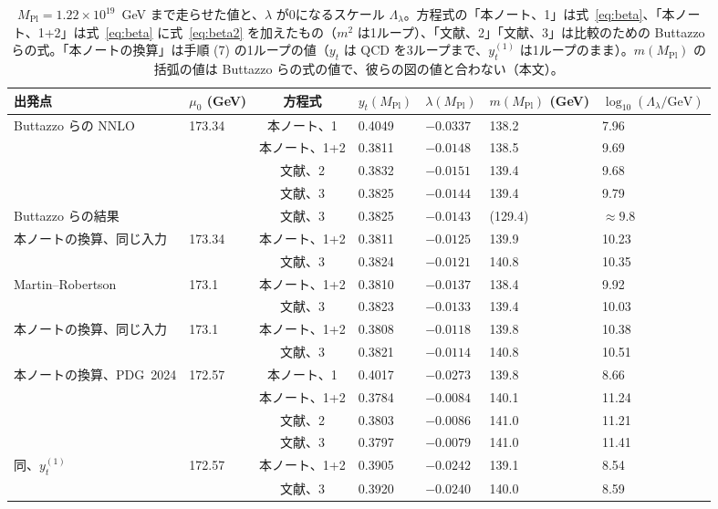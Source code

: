 \documentclass[a4paper,10pt]{ltjsarticle}
\begin{document}
\begin{table}[tbp]
\centering\footnotesize\setlength{\tabcolsep}{4.5pt}
\caption{$M_{\mathrm{Pl}}=1.22\times10^{19}$~GeV まで走らせた値と、$\lambda$ が0になるスケール $\Lambda_\lambda$。方程式の「本ノート、1」は式~\eqref{eq:beta}、「本ノート、1+2」は式~\eqref{eq:beta} に式~\eqref{eq:beta2} を加えたもの（$m^2$ は1ループ）、「文献、2」「文献、3」は比較のための Buttazzo らの式。「本ノートの換算」は手順 (7) の1ループの値（$y_t$ は QCD を3ループまで、$y_t^{(1)}$ は1ループのまま）。$m(M_{\mathrm{Pl}})$ の括弧の値は Buttazzo らの式の値で、彼らの図の値と合わない（本文）。}
\label{tab:rgrun}
\begin{tabular}{llcllll}
\toprule
出発点 & $\mu_0$ (GeV) & 方程式 & $y_t(M_{\mathrm{Pl}})$ & $\lambda(M_{\mathrm{Pl}})$ & $m(M_{\mathrm{Pl}})$ (GeV) & $\log_{10}(\Lambda_\lambda/\mathrm{GeV})$ \\
\midrule
Buttazzo らの NNLO & 173.34 & 本ノート、1 & 0.4049 & $-0.0337$ & 138.2 & 7.96 \\
 & & 本ノート、1+2 & 0.3811 & $-0.0148$ & 138.5 & 9.69 \\
 & & 文献、2 & 0.3832 & $-0.0151$ & 139.4 & 9.68 \\
 & & 文献、3 & 0.3825 & $-0.0144$ & 139.4 & 9.79 \\
Buttazzo らの結果 & & 文献、3 & 0.3825 & $-0.0143$ & (129.4) & $\approx9.8$ \\
本ノートの換算、同じ入力 & 173.34 & 本ノート、1+2 & 0.3811 & $-0.0125$ & 139.9 & 10.23 \\
 & & 文献、3 & 0.3824 & $-0.0121$ & 140.8 & 10.35 \\
\midrule
Martin--Robertson & 173.1 & 本ノート、1+2 & 0.3810 & $-0.0137$ & 138.4 & 9.92 \\
 & & 文献、3 & 0.3823 & $-0.0133$ & 139.4 & 10.03 \\
本ノートの換算、同じ入力 & 173.1 & 本ノート、1+2 & 0.3808 & $-0.0118$ & 139.8 & 10.38 \\
 & & 文献、3 & 0.3821 & $-0.0114$ & 140.8 & 10.51 \\
\midrule
本ノートの換算、PDG~2024 & 172.57 & 本ノート、1 & 0.4017 & $-0.0273$ & 139.8 & 8.66 \\
 & & 本ノート、1+2 & 0.3784 & $-0.0084$ & 140.1 & 11.24 \\
 & & 文献、2 & 0.3803 & $-0.0086$ & 141.0 & 11.21 \\
 & & 文献、3 & 0.3797 & $-0.0079$ & 141.0 & 11.41 \\
同、$y_t^{(1)}$ & 172.57 & 本ノート、1+2 & 0.3905 & $-0.0242$ & 139.1 & 8.54 \\
 & & 文献、3 & 0.3920 & $-0.0240$ & 140.0 & 8.59 \\
\bottomrule
\end{tabular}
\end{table}
\end{document}
